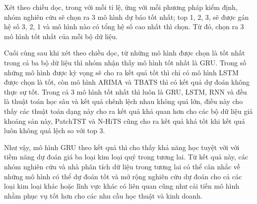 \documentclass[conference]{IEEEtran}
\begin{document}
\indent Xét theo chiều dọc, trong với mỗi tỉ lệ, ứng với mỗi phương pháp kiểm định, nhóm nghiên cứu sẽ chọn ra 3 mô hình dự báo tốt nhất; top 1, 2, 3, sẽ được gán hệ số 3, 2, 1 và mô hình nào có tổng hệ số cao nhất thì chọn. Từ đó, chọn ra 3 mô hình tốt nhất của mỗi bộ dữ liệu.

\begin{table}[h!]
    \centering
    \caption{\centering Bảng xếp hạng các mô hình được đánh giá theo chiều dọc}
    \label{table:models}
\end{table}

\indent Cuối cùng sau khi xét theo chiều dọc, từ những mô hình được chọn là tốt nhất trong cả ba bộ dữ liệu thì nhóm nhận thấy mô hình tốt nhất là GRU. Trong số những mô hình được kỳ vọng sẽ cho ra kết quả tốt thì chỉ có mô hình LSTM được chọn là tốt, còn mô hình ARIMA và TBATS thì có kết quả dự đoán không thực sự tốt. Trong cả 3 mô hình tốt nhất thì luôn là GRU, LSTM, RNN và đều là thuật toán học sâu và kết quả chênh lệch nhau không quá lớn, điều này cho thấy các thuật toán dạng này cho ra kết quả khả quan hơn cho các bộ dữ liệu giá khoáng sản này, PatchTST và N-HiTS cũng cho ra kết quả khá tốt khi kết quả luôn không quá lệch so với top 3.

\indent Như vậy, mô hình GRU theo kết quả thì cho thấy khả năng học tuyệt vời với tiềm năng dự đoán giá ba loại kim loại quý trong tương lai. Từ kết quả này, các nhóm nghiên cứu và nhà phân tích dữ liệu trong tương lai có thể cân nhắc về những mô hình có thể dự đoán tốt và mở rộng nghiên cứu dự đoán cho cả các loại kim loại khác hoặc lĩnh vực khác có liên quan cũng như cải tiến mô hình nhằm phục vụ tốt hơn cho các nhu cầu học thuật và kinh doanh.
\end{document}
